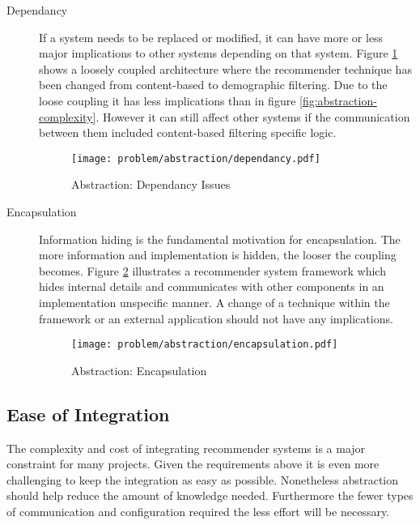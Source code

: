 \begin{description}
    \item[Dependancy] If a system needs to be replaced or modified, it can have more or less major implications to other systems depending on that system. Figure \ref{fig:abstraction-dependancy} shows a loosely coupled architecture where the recommender technique has been changed from content-based to demographic filtering. Due to the loose coupling it has less implications than in figure \ref{fig:abstraction-complexity}. However it can still affect other systems if the communication between them included content-based filtering specific logic.

    \begin{figure}[H]
        \texttt{[image: problem/abstraction/dependancy.pdf]}
        \caption{Abstraction: Dependancy Issues}
        \label{fig:abstraction-dependancy}
    \end{figure}

    \item[Encapsulation] Information hiding is the fundamental motivation for encapsulation. The more information and implementation is hidden, the looser the coupling becomes. Figure \ref{fig:abstraction-encapsulation} illustrates a recommender system framework which hides internal details and communicates with other components in an implementation unspecific manner. A change of a technique within the framework or an external application should not have any implications.

    \begin{figure}[H]
        \texttt{[image: problem/abstraction/encapsulation.pdf]}
        \caption{Abstraction: Encapsulation}
        \label{fig:abstraction-encapsulation}
    \end{figure}
\end{description}

\subsection{Ease of Integration}

The complexity and cost of integrating recommender systems is a major constraint for many projects. Given the requirements above it is even more challenging to keep the integration as easy as possible. Nonetheless abstraction should help reduce the amount of knowledge needed. Furthermore the fewer types of communication and configuration required the less effort will be necessary.




